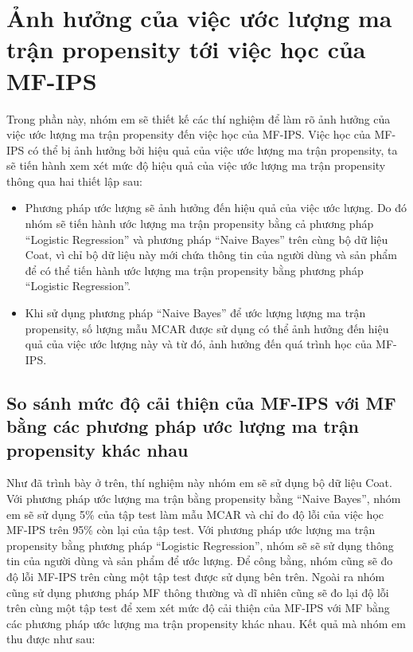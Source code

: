 \section{Ảnh hưởng của việc ước lượng ma trận propensity tới việc học của MF-IPS}
Trong phần này, nhóm em sẽ thiết kế các thí nghiệm để làm rõ ảnh hưởng của việc ước lượng ma trận propensity đến việc học của MF-IPS. Việc học của MF-IPS có thể bị ảnh hưởng bởi hiệu quả của việc ước lượng ma trận propensity, ta sẽ tiến hành xem xét mức độ hiệu quả của việc ước lượng ma trận propensity thông qua hai thiết lập sau:
\begin{itemize}
    \item Phương pháp ước lượng sẽ ảnh hưởng đến hiệu quả của việc ước lượng. Do đó nhóm sẽ tiến hành ước lượng ma trận propensity bằng cả phương pháp ``Logistic Regression'' và phương pháp ``Naive Bayes'' trên cùng bộ dữ liệu Coat, vì chỉ bộ dữ liệu này mới chứa thông tin của người dùng và sản phẩm để có thể tiến hành ước lượng ma trận propensity bằng phương pháp ``Logistic Regression''. 
    \item Khi sử dụng phương pháp ``Naive Bayes'' để ước lượng lượng ma trận propensity, số lượng mẫu MCAR được sử dụng có thể ảnh hưởng đến hiệu quả của việc ước lượng này và từ đó, ảnh hưởng đến quá trình học của MF-IPS.
\end{itemize}

\subsection{So sánh mức độ cải thiện của MF-IPS với MF bằng các phương pháp ước lượng ma trận propensity khác nhau}
Như đã trình bày ở trên, thí nghiệm này nhóm em sẽ sử dụng bộ dữ liệu Coat.
Với phương pháp ước lượng ma trận bằng propensity bằng ``Naive Bayes'', nhóm em sẽ sử dụng 5\% của tập test làm mẫu MCAR và chỉ đo độ lỗi của việc học MF-IPS trên 95\% còn lại của tập test. Với phương pháp ước lượng ma trận propensity bằng phương pháp ``Logistic Regression'', nhóm sẽ sẽ sử dụng thông tin của người dùng và sản phẩm để ước lượng. Để công bằng, nhóm cũng sẽ đo độ lỗi MF-IPS trên cùng một tập test được sử dụng bên trên. Ngoài ra nhóm cũng sử dụng phương pháp MF thông thường và dĩ nhiên cũng sẽ đo lại độ lỗi trên cùng một tập test để xem xét mức độ cải thiện của MF-IPS với MF bằng các phương pháp ước lượng ma trận propensity khác nhau. Kết quả mà nhóm em thu được như sau:

